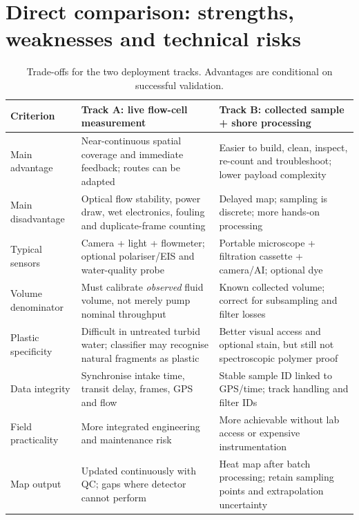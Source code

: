 \documentclass[10pt,a4paper]{article}
\begin{document}
\section{Direct comparison: strengths, weaknesses and technical risks}
\begin{table}[H]\centering\footnotesize
\caption{Trade-offs for the two deployment tracks. Advantages are conditional on successful validation.}\label{tab:proscons}
\begin{tabularx}{\linewidth}{@{}p{2.1cm}X X@{}}\toprule
Criterion & Track A: live flow-cell measurement & Track B: collected sample + shore processing \\\midrule
Main advantage & Near-continuous spatial coverage and immediate feedback; routes can be adapted & Easier to build, clean, inspect, re-count and troubleshoot; lower payload complexity \\
Main disadvantage & Optical flow stability, power draw, wet electronics, fouling and duplicate-frame counting & Delayed map; sampling is discrete; more hands-on processing \\
Typical sensors & Camera + light + flowmeter; optional polariser/EIS and water-quality probe & Portable microscope + filtration cassette + camera/AI; optional dye \\
Volume denominator & Must calibrate \emph{observed} fluid volume, not merely pump nominal throughput & Known collected volume; correct for subsampling and filter losses \\
Plastic specificity & Difficult in untreated turbid water; classifier may recognise natural fragments as plastic & Better visual access and optional stain, but still not spectroscopic polymer proof \\
Data integrity & Synchronise intake time, transit delay, frames, GPS and flow & Stable sample ID linked to GPS/time; track handling and filter IDs \\
Field practicality & More integrated engineering and maintenance risk & More achievable without lab access or expensive instrumentation \\
Map output & Updated continuously with QC; gaps where detector cannot perform & Heat map after batch processing; retain sampling points and extrapolation uncertainty \\
\bottomrule\end{tabularx}
\end{table}
\end{document}
